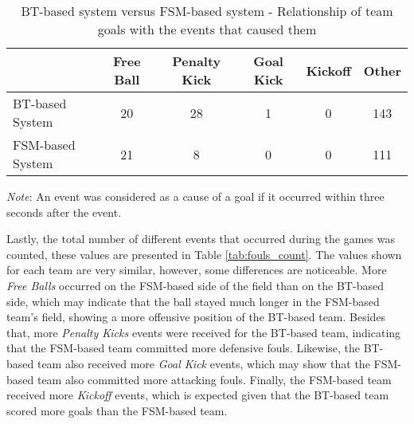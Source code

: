 \begin{table}[h]
    \begin{minipage}{\columnwidth}
        \centering
        \begin{tabular}{l c c c c c}
            \toprule
                             & Free Ball & Penalty Kick & Goal Kick & Kickoff & Other \\
            \midrule
            BT-based System  & 20        & 28           & 1         & 0       & 143   \\
            FSM-based System & 21        & 8            & 0         & 0       & 111   \\
            \bottomrule
        \end{tabular}
        \begin{center}
            \footnotesize
            \emph{Note}: An event was considered as a cause of a goal if it occurred within three seconds after the event.
        \end{center}
    \end{minipage}
    \caption{BT-based system versus FSM-based system - Relationship of team goals with the events that caused them}
    \label{tab:goals_reasons}
\end{table}

Lastly, the total number of different events that occurred during the games was counted, these values are presented in Table \ref{tab:fouls_count}. The values shown for each team are very similar, however, some differences are noticeable. More \textit{Free Balls} occurred on the FSM-based side of the field than on the BT-based side, which may indicate that the ball stayed much longer in the FSM-based team's field, showing a more offensive position of the BT-based team. Besides that, more \textit{Penalty Kicks} events were received for the BT-based team, indicating that the FSM-based team committed more defensive fouls. Likewise, the BT-based team also received more \textit{Goal Kick} events, which may show that the FSM-based team also committed more attacking fouls. Finally, the FSM-based team received more \textit{Kickoff} events, which is expected given that the BT-based team scored more goals than the FSM-based team.

